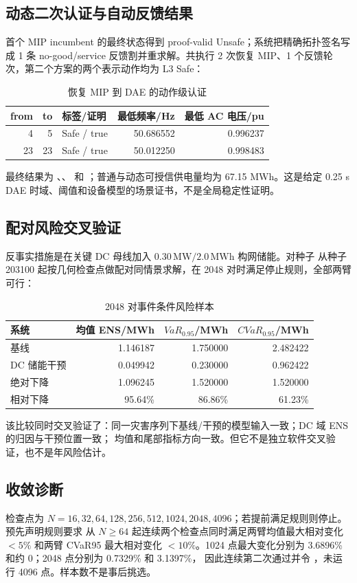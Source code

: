 \subsection{动态二次认证与自动反馈结果}
首个 MIP incumbent 的最终状态得到 proof-valid Unsafe；系统把精确拓扑签名写成 1 条 no-good/service
反馈割并重求解。共执行 2 次恢复 MIP、1 个反馈轮次，第二个方案的两个表示动作均为 L3 Safe：
\begin{table}[H]\centering\small
\caption{恢复 MIP 到 DAE 的动作级认证}
\begin{tabular}{rrlrr}
\toprule
from & to & 标签/证明 & 最低频率/Hz & 最低 AC 电压/pu\\\midrule
4 & 5 & Safe / true & 50.686552 & 0.996237\\
23 & 23 & Safe / true & 50.012250 & 0.998483\\
\bottomrule
\end{tabular}
\end{table}
最终结果为 、、
 和 ；普通与动态可授信供电量均为
67.15 MWh。这是给定 0.25 s DAE 时域、阈值和设备模型的场景证书，不是全局稳定性证明。

\subsection{配对风险交叉验证}
反事实措施是在关键 DC 母线加入 $0.30\,\mathrm{MW}/2.0\,\mathrm{MWh}$ 构网储能。对种子
从种子 203100 起按几何检查点做配对同情景求解，在 2048 对时满足停止规则，全部两臂可行：
\begin{table}[H]\centering\small
\caption{2048 对事件条件风险样本}
\begin{tabular}{lrrr}
\toprule
系统 & 均值 ENS/MWh & $VaR_{0.95}$/MWh & $CVaR_{0.95}$/MWh\\\midrule
基线 & 1.146187 & 1.750000 & 2.482422\\
DC 储能干预 & 0.049942 & 0.230000 & 0.962422\\
绝对下降 & 1.096245 & 1.520000 & 1.520000\\
相对下降 & 95.64\% & 86.86\% & 61.23\%\\
\bottomrule
\end{tabular}
\end{table}
该比较同时交叉验证了：同一灾害序列下基线/干预的模型输入一致；DC 域 ENS 的归因与干预位置一致；
均值和尾部指标方向一致。但它不是独立软件交叉验证，也不是年风险估计。

\subsection{收敛诊断}
检查点为 $N=16,32,64,128,256,512,1024,2048,4096$；若提前满足规则则停止。预先声明规则要求
从 $N\ge64$ 起连续两个检查点同时满足两臂均值最大相对变化 $<5\%$ 和两臂 CVaR95 最大相对变化
$<10\%$。1024 点最大变化分别为 3.6896\% 和约 0；2048 点分别为 0.7329\% 和 3.1397\%，
因此连续第二次通过并令 ，未运行 4096 点。样本数不是事后挑选。

